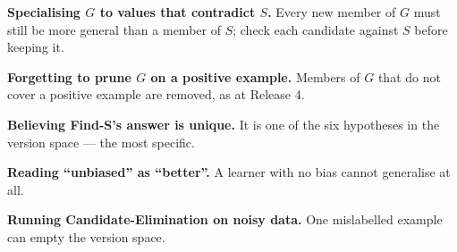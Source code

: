 \begin{pitfall}
\begin{tight}
  \item \textbf{Specialising $G$ to values that contradict $S$.} Every new
        member of $G$ must still be more general than a member of $S$; check each
        candidate against $S$ before keeping it.
  \item \textbf{Forgetting to prune $G$ on a positive example.} Members of $G$ that
        do not cover a positive example are removed, as at Release 4.
  \item \textbf{Believing Find-S's answer is unique.} It is one of the
        six hypotheses in the version space --- the most specific.
  \item \textbf{Reading ``unbiased'' as ``better''.} A learner with no bias
        cannot generalise at all.
  \item \textbf{Running Candidate-Elimination on noisy data.} One
        mislabelled example can empty the version space.
\end{tight}
\end{pitfall}

